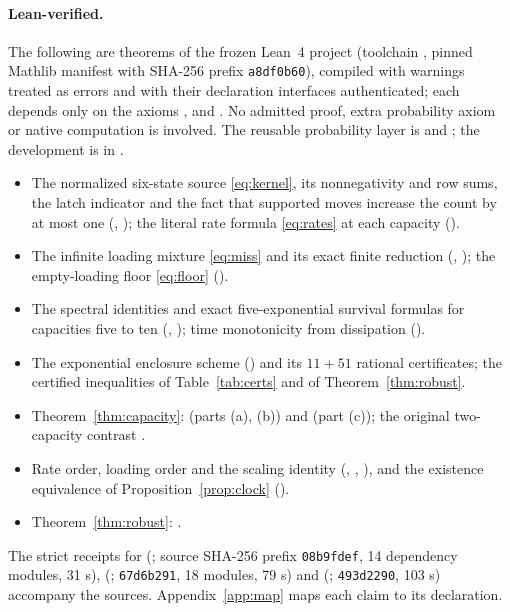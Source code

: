 \documentclass[11pt,a4paper]{article}
\theoremstyle{plain}
\theoremstyle{definition}
\theoremstyle{remark}
\begin{document}
\paragraph{Lean-verified.} The following are theorems of the frozen Lean~4 project (toolchain , pinned Mathlib manifest with SHA-256 prefix \texttt{a8df0b60}), compiled with warnings treated as errors and with their declaration interfaces authenticated; each depends only on the axioms ,  and . No admitted proof, extra probability axiom or native computation is involved. The reusable probability layer is  and ; the development is in .
\begin{itemize}
\item The normalized six-state source \eqref{eq:kernel}, its nonnegativity and row sums, the latch indicator and the fact that supported moves increase the count by at most one (, ); the literal rate formula \eqref{eq:rates} at each capacity ().
\item The infinite loading mixture \eqref{eq:miss} and its exact finite reduction (, ); the empty-loading floor \eqref{eq:floor} ().
\item The spectral identities and exact five-exponential survival formulas for capacities five to ten (, ); time monotonicity from dissipation ().
\item The exponential enclosure scheme () and its $11+51$ rational certificates; the certified inequalities of Table~\ref{tab:certs} and of Theorem~\ref{thm:robust}.
\item Theorem~\ref{thm:capacity}:  (parts (a), (b)) and  (part (c)); the original two-capacity contrast .
\item Rate order, loading order and the scaling identity (, , ), and the existence equivalence of Proposition~\ref{prop:clock} ().
\item Theorem~\ref{thm:robust}: .
\end{itemize}
The strict receipts for  (; source SHA-256 prefix \texttt{08b9fdef}, 14 dependency modules, 31 s),  (; \texttt{67d6b291}, 18 modules, 79 s) and  (; \texttt{493d2290}, 103 s) accompany the sources. Appendix~\ref{app:map} maps each claim to its declaration.
\end{document}
